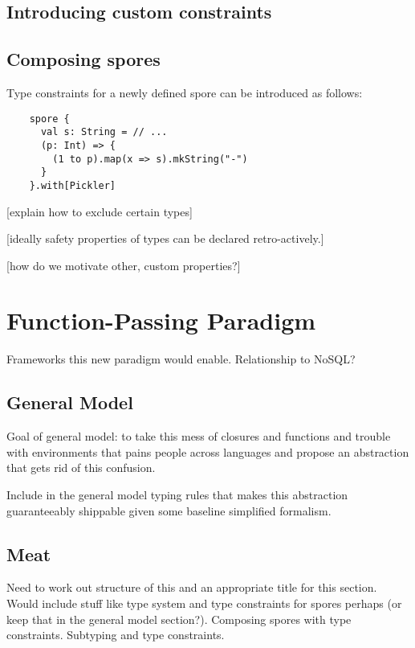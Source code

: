 \documentclass{llncs}
\begin{document}
\subsection{Introducing custom constraints}

\subsection{Composing spores}


Type constraints for a newly defined spore can be introduced as follows:
\begin{lstlisting}
    spore {
      val s: String = // ...
      (p: Int) => {
        (1 to p).map(x => s).mkString("-")
      }
    }.with[Pickler]
\end{lstlisting}
\noindent

[explain how to exclude certain types]

[ideally safety properties of types can be declared retro-actively.]

[how do we motivate other, custom properties?]



\section{Function-Passing Paradigm}

Frameworks this new paradigm would enable. Relationship to NoSQL?

\subsection{General Model}

Goal of general model: to take this mess of closures and functions and trouble with environments that pains people across languages and propose an abstraction that gets rid of this confusion.

Include in the general model typing rules that makes this abstraction guaranteeably shippable
given some baseline simplified formalism.

\subsection{Meat}

Need to work out structure of this and an appropriate title for this section. Would include stuff like type system and type constraints for spores perhaps (or keep that in the general model section?). Composing spores with type constraints. Subtyping and type constraints.
\end{document}
